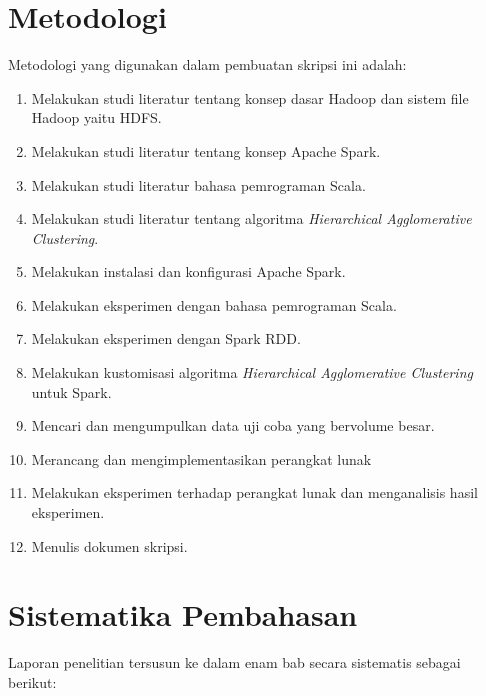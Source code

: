 \section{Metodologi}
\label{sec:metlit}
Metodologi yang digunakan dalam pembuatan skripsi ini adalah:
\begin{enumerate}

\item Melakukan studi literatur tentang konsep dasar Hadoop dan sistem file Hadoop yaitu HDFS.

\item Melakukan studi literatur tentang konsep Apache Spark.

\item Melakukan studi literatur bahasa pemrograman Scala.

\item Melakukan studi literatur tentang algoritma {\it Hierarchical Agglomerative Clustering}.

\item Melakukan instalasi dan konfigurasi Apache Spark.

\item Melakukan eksperimen dengan bahasa pemrograman Scala.

\item Melakukan eksperimen dengan Spark RDD.

\item Melakukan kustomisasi algoritma {\it Hierarchical Agglomerative Clustering} untuk Spark.

\item Mencari dan mengumpulkan data uji coba yang bervolume besar.

\item Merancang dan mengimplementasikan perangkat lunak

\item Melakukan eksperimen terhadap perangkat lunak dan menganalisis hasil eksperimen.

\item Menulis dokumen skripsi.




\end{enumerate}

\section{Sistematika Pembahasan}
\label{sec:sispem}

Laporan penelitian tersusun ke dalam enam bab secara sistematis sebagai berikut:

